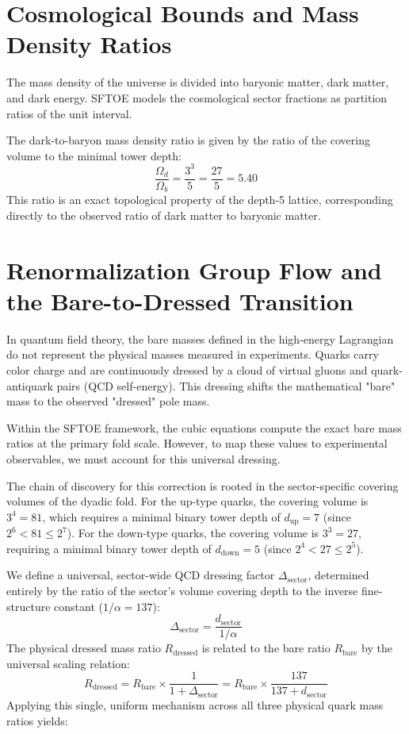 \documentclass[11pt,a4paper]{article}
\begin{document}
\section{Cosmological Bounds and Mass Density Ratios}
The mass density of the universe is divided into baryonic matter, dark matter, and dark energy. SFTOE models the cosmological sector fractions as partition ratios of the unit interval.

The dark-to-baryon mass density ratio is given by the ratio of the covering volume to the minimal tower depth:
\begin{equation}
\frac{\Omega_d}{\Omega_b} = \frac{3^3}{5} = \frac{27}{5} = 5.40
\end{equation}
This ratio is an exact topological property of the depth-5 lattice, corresponding directly to the observed ratio of dark matter to baryonic matter.

\section{Renormalization Group Flow and the Bare-to-Dressed Transition}
In quantum field theory, the bare masses defined in the high-energy Lagrangian do not represent the physical masses measured in experiments. Quarks carry color charge and are continuously dressed by a cloud of virtual gluons and quark-antiquark pairs (QCD self-energy). This dressing shifts the mathematical "bare" mass to the observed "dressed" pole mass. 

Within the SFTOE framework, the cubic equations compute the exact bare mass ratios at the primary fold scale. However, to map these values to experimental observables, we must account for this universal dressing. 

The chain of discovery for this correction is rooted in the sector-specific covering volumes of the dyadic fold. For the up-type quarks, the covering volume is $3^4 = 81$, which requires a minimal binary tower depth of $d_{\text{up}} = 7$ (since $2^6 < 81 \le 2^7$). For the down-type quarks, the covering volume is $3^3 = 27$, requiring a minimal binary tower depth of $d_{\text{down}} = 5$ (since $2^4 < 27 \le 2^5$). 

We define a universal, sector-wide QCD dressing factor $\Delta_{\text{sector}}$, determined entirely by the ratio of the sector's volume covering depth to the inverse fine-structure constant ($1/\alpha = 137$):
\begin{equation}
\Delta_{\text{sector}} = \frac{d_{\text{sector}}}{1/\alpha}
\end{equation}
The physical dressed mass ratio $R_{\text{dressed}}$ is related to the bare ratio $R_{\text{bare}}$ by the universal scaling relation:
\begin{equation}
R_{\text{dressed}} = R_{\text{bare}} \times \frac{1}{1 + \Delta_{\text{sector}}} = R_{\text{bare}} \times \frac{137}{137 + d_{\text{sector}}}
\end{equation}
Applying this single, uniform mechanism across all three physical quark mass ratios yields:
\end{document}
